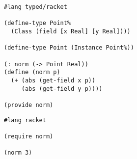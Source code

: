 \begin{minipage}[t]{0.4\textwidth}
\flushleft
\begin{verbatim}
#lang typed/racket

(define-type Point%
  (Class (field [x Real] [y Real])))

(define-type Point (Instance Point%))

(: norm (-> Point Real))
(define (norm p)
  (+ (abs (get-field x p))
     (abs (get-field y p))))

(provide norm)
\end{verbatim}
\end{minipage}%
\hfill%
\begin{minipage}[t]{0.4\textwidth}
  \flushright
  \begin{verbatim}
#lang racket

(require norm)

(norm 3)
\end{verbatim}
\end{minipage}
